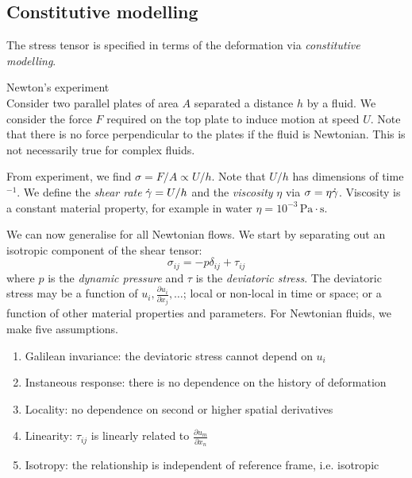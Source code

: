 \documentclass{jknotes}
\begin{document}
\subsection{Constitutive modelling}
The stress tensor is specified in terms of the deformation via \emph{constitutive
modelling}.

\begin{eg}{Newton's experiment\\}
Consider two parallel plates of area $A$ separated a distance $h$ by a fluid.
We consider the force $F$ required on the top plate to induce motion at speed
$U$. Note that there is no force perpendicular to the plates if the fluid is
Newtonian. This is not necessarily true for complex fluids.
\begin{center}
\end{center}

From experiment, we find $\sigma = F/A \propto U/h$. Note that $U/h$ has
dimensions of time$^{-1}$. We define the \emph{shear rate} $\dot{\gamma} =
U/h$ and the \emph{viscosity} $\eta$ via $\sigma = \eta \dot{\gamma}$.
Viscosity is a constant material property, for example in water $\eta =
10^{-3}\, \text{Pa}\cdot\text{s}$.

\end{eg}

We can now generalise for all Newtonian flows. We start by separating out an
isotropic component of the shear tensor:
\begin{equation}
	\sigma_{ij} = -p \delta_{ij} + \tau_{ij}
\end{equation}
where $p$ is the \emph{dynamic pressure} and $\tau$ is the \emph{deviatoric
stress}. The deviatoric stress may be a function of $u_i, \frac{\partial u_i}{\partial
x_j}, \dots$; local or non-local in time or space; or a function of other
material properties and parameters. For Newtonian fluids, we make five
assumptions.

\begin{enumerate}
	\item Galilean invariance: the deviatoric stress cannot depend on $u_i$
	\item Instaneous response: there is no dependence on the history of
		deformation
	\item Locality: no dependence on second or higher spatial derivatives
	\item Linearity: $\tau_{ij}$ is linearly related to $\frac{\partial
		u_m}{\partial x_n}$
	\item Isotropy: the relationship is independent of reference frame, i.e.
		isotropic
\end{enumerate}
\end{document}
